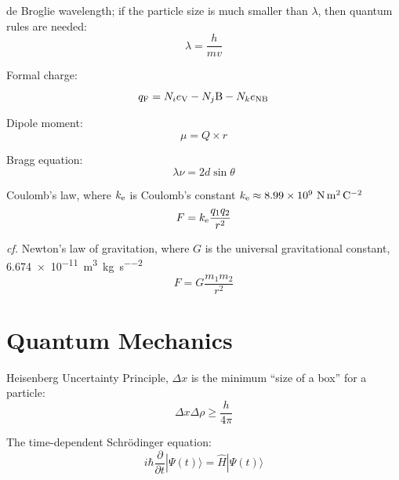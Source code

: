 \documentclass[10pt]{article}
\begin{document}
de Broglie wavelength; if the particle size is much smaller than $\lambda$, then quantum rules are needed:
\begin{equation*}
\lambda=\frac{h}{mv}
\end{equation*}

Formal charge:
\begin{equation*}
q_\textnormal{F} = N_ie_\textnormal{V} - N_j\textnormal{B} - N_ke_\textnormal{NB} 
\end{equation*}

Dipole moment:
\begin{equation*}
\mu = Q\times r
\end{equation*}

Bragg equation:
\begin{equation*}
\lambda\nu = 2d \sin \theta
\end{equation*}

Coulomb's law, where $k_\textnormal{e}$ is Coulomb's constant $k_{\textnormal{e}}\approx\num{8.99e9}~\si{\newton\meter\squared\per\coulomb\squared}$
\begin{equation*}
F = k_{\textnormal{e}}\frac{q_1q_2}{r^2}
\end{equation*}

\textit{cf.} Newton's law of gravitation, where $G$ is the universal gravitational constant, \num{6.674e-11}~\si{\cubic\meter\per\kg\per\second\squared}
\begin{equation*}
F = G\frac{m_1m_2}{r^2}
\end{equation*}

\newpage
\section{Quantum Mechanics}

Heisenberg Uncertainty Principle, $\Delta x$ is the minimum ``size of a box'' for a particle:
\begin{equation*}
\Delta x \Delta\rho \ge \frac{h}{4\pi}
\end{equation*}

The time-dependent Schr\"odinger equation:
\begin{equation*}
i\hbar\frac{\partial}{\partial t}|\Psi(t)\rangle = \hat{H}|\Psi(t)\rangle
\end{equation*}
\end{document}
